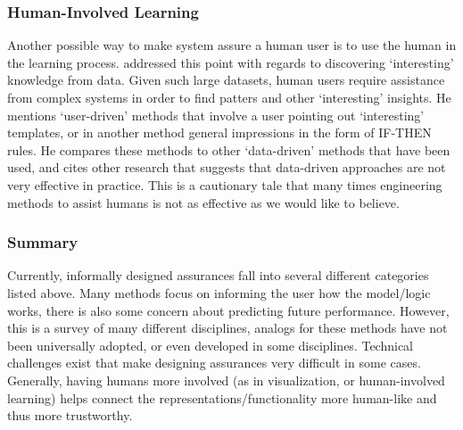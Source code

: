 \subsubsection{Human-Involved Learning}
    Another possible way to make system assure a human user is to use the human in the learning process. \citet{Freitas2006-qo} addressed this point with regards to discovering `interesting' knowledge from data. Given such large datasets, human users require assistance from complex systems in order to find patters and other `interesting' insights. He mentions `user-driven' methods that involve a user pointing out `interesting' templates, or in another method general impressions in the form of IF-THEN rules. He compares these methods to other `data-driven' methods that have been used, and cites other research that suggests that data-driven approaches are not very effective in practice. This is a cautionary tale that many times engineering methods to assist humans is not as effective as we would like to believe.

\subsubsection{Summary}
Currently, informally designed assurances fall into several different categories listed above. Many methods focus on informing the user how the model/logic works, there is also some concern about predicting future performance. However, this is a survey of many different disciplines, analogs for these methods have not been universally adopted, or even developed in some disciplines. Technical challenges exist that make designing assurances very difficult in some cases. Generally, having humans more involved (as in visualization, or human-involved learning) helps connect the representations/functionality more human-like and thus more trustworthy.
